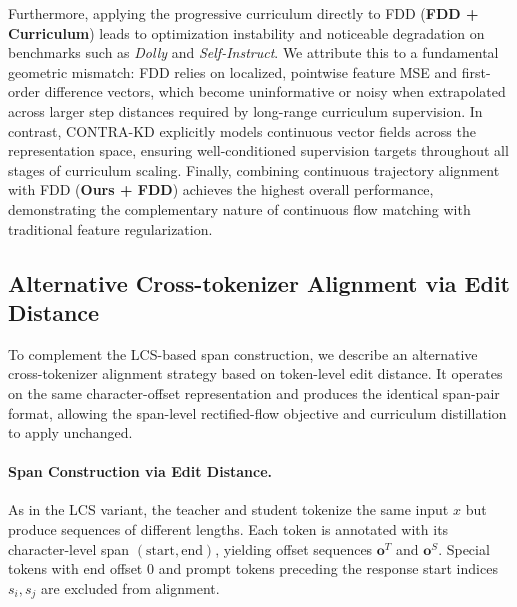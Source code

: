\documentclass{article} %
\theoremstyle{definition}
\theoremstyle{remark}
\begin{document}
Furthermore, applying the progressive curriculum directly to FDD (\textbf{FDD + Curriculum}) leads to optimization instability and noticeable degradation on benchmarks such as \textit{Dolly} and \textit{Self-Instruct}. We attribute this to a fundamental geometric mismatch: FDD relies on localized, pointwise feature MSE and first-order difference vectors, which become uninformative or noisy when extrapolated across larger step distances required by long-range curriculum supervision. In contrast, CONTRA-KD explicitly models continuous vector fields across the representation space, ensuring well-conditioned supervision targets throughout all stages of curriculum scaling. Finally, combining continuous trajectory alignment with FDD (\textbf{Ours + FDD}) achieves the highest overall performance, demonstrating the complementary nature of continuous flow matching with traditional feature regularization.

\subsection{Alternative Cross-tokenizer Alignment via Edit Distance}
\label{app:edit_distance_alignment}

To complement the LCS-based span construction, we describe an alternative cross-tokenizer alignment strategy based on token-level edit distance. It operates on the same character-offset representation and produces the identical span-pair format, allowing the span-level rectified-flow objective and curriculum distillation to apply unchanged.

\paragraph{Span Construction via Edit Distance.}
As in the LCS variant, the teacher and student tokenize the same input $x$ but produce sequences of different lengths. Each token is annotated with its character-level span $(\mathrm{start}, \mathrm{end})$, yielding offset sequences $\mathbf{o}^T$ and $\mathbf{o}^S$. Special tokens with end offset $0$ and prompt tokens preceding the response start indices $s_i, s_j$ are excluded from alignment.
\end{document}
